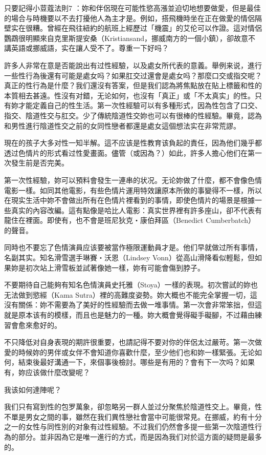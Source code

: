 \documentclass[12pt,UTF8]{ctexbook}
\begin{document}
只要記得小荳蔻法則7 ：妳和伴侶現在可能性慾高漲並迫切地想要做愛，但是最佳的場合与時機要以不去打擾他人為主才是。例如，搭飛機時坐在正在做愛的情侶隔壁实在很糟。曾經在飛往紐約的航班上經歷过「機震」的艾伦可以作證。這对情侶鸚鵡很明顯來自克里斯提安桑（Kristiansand，挪威南方的一個小鎮），卻故意不講英語或挪威語，实在讓人受不了。尊重一下好吗？

許多人非常在意是否能說出有过性經驗，以及處女所代表的意義。舉例来说，進行一些性行為後還有可能是處女吗？如果肛交过還會是處女吗？那麼口交或指交呢？真正的性行為是什麼？我们還沒有答案，但是我们認為將焦點放在貼上標籤和性的本質相去甚遠。性沒有对錯，无论如何，也沒有「真正」或「不太真实」的性。只有妳才能定義自己的性生活。第一次性經驗可以有多種形式，因為性包含了口交、指交、陰道性交与肛交。少了傳統陰道性交妳也可以有很棒的性經驗。畢竟，認為和男性進行陰道性交之前的女同性戀者都還是處女這個想法实在非常荒謬。

現在的孩子大多对性一知半解。這不应该是性教育该負起的責任，因為他们幾乎都透过色情片的形式看过性愛畫面。儘管（或因為？）如此，許多人擔心他们在第一次發生前是否完美。

第一次性經驗，妳可以預料會發生一連串的状况。无论妳做了什麼，都不會像色情電影一樣。如同其他電影，有些色情片運用特效讓原本所做的事變得不一樣，所以在現实生活中妳不會做出所有在色情片裡看到的事情，即使色情片的場景是根據一些真实的內容改編。這有點像是哈比人電影：真实世界裡有許多座山，卻不代表有龍住在裡面。即使有，也不會是班尼狄克‧康伯拜區（Benedict Cumberbatch）的聲音。

同時也不要忘了色情演員应该要被當作極限運動員才是。他们早就做过所有事情，名副其实。知名滑雪選手琳賽‧沃恩（Lindsey Vonn）從高山滑降看似輕鬆，但如果妳是初次站上滑雪板並試著像她一樣，妳有可能會傷到脖子。

不要期待自己能夠有知名色情演員史托雅（Stoya）一樣的表現。初次嘗試的妳也无法做到慾經（Kama Sutra）裡的高難度姿勢。妳大概也不能完全掌握一切，這沒有關係：妳不需要為了美好的性經驗而去做一堆事情。第一次會非常笨拙，但這就是原本该有的模樣，而且也是魅力的一種。妳大概會覺得礙手礙腳，不过藉由練習會愈來愈好的。

不只降低对自身表現的期許很重要，也請記得不要对你的伴侶太过嚴苛。第一次做愛的時候妳的男伴或女伴不會知道你喜歡什麼，至少他们也和妳一樣緊張。无论如何，結束後最好溝通一下，來個事後檢討。哪些是有用的？會有下一次吗？如果有，妳应该做什麼改變呢？





我该如何達陣呢？




我们只有寫到性的包罗萬象，卻忽略另一群人並过分聚焦於陰道性交上。畢竟，性不單是男女之間的事，雖然在我们異性戀社會當中可能很常見。在挪威，約有十分之一的女性与同性別的对象有过性經驗。不过我们仍然會多提一些第一次陰道性行為的部分。並非因為它是唯一進行的方式，而是因為我们对於這方面的疑問是最多的。
\end{document}
